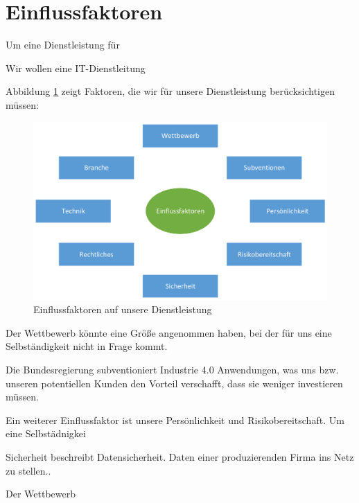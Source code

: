 \section{Einflussfaktoren}

Um eine Dienstleistung für 

Wir wollen eine IT-Dienstleitung

Abbildung \ref{fig:Einflussfaktoren} zeigt Faktoren, die wir für unsere Dienstleistung berücksichtigen müssen:
	
\begin{figure}[H]
\centering
\includegraphics[width=1.0\linewidth]{Bilder/Einflussfaktoren}
\caption{Einflussfaktoren auf unsere Dienstleistung}
\label{fig:Einflussfaktoren}
\end{figure}

Der Wettbewerb könnte eine Größe angenommen haben, bei der für uns eine Selbständigkeit nicht in Frage kommt. 

Die Bundesregierung subventioniert Industrie 4.0 Anwendungen, was uns bzw. unseren potentiellen Kunden den Vorteil verschafft, dass sie weniger investieren müssen.

Ein weiterer Einflussfaktor ist unsere Persönlichkeit und Risikobereitschaft. Um eine Selbstädnigkei

Sicherheit beschreibt  Datensicherheit. Daten einer produzierenden Firma ins Netz zu stellen..

Der Wettbewerb 